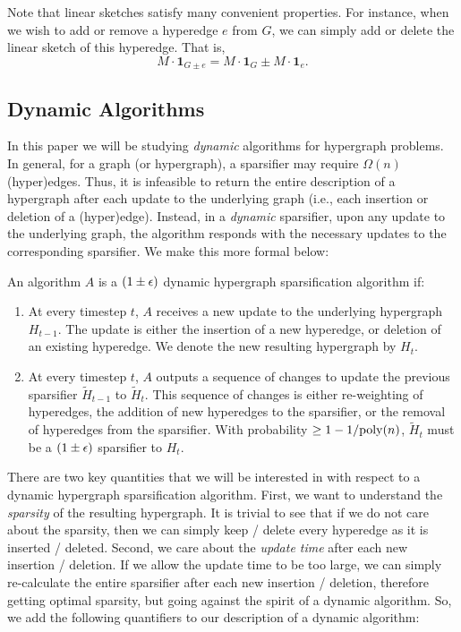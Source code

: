 \documentclass{article}
\begin{document}
Note that linear sketches satisfy many convenient properties. For instance, when we wish to add or remove a hyperedge $e$ from $G$, we can simply add or delete the linear sketch of this hyperedge. That is,
\[
M \cdot \mathbf{1}_{G\pm e} = M \cdot \mathbf{1}_{G} \pm M \cdot \mathbf{1}_e.
\]

\subsection{Dynamic Algorithms}

In this paper we will be studying \emph{dynamic} algorithms for hypergraph problems. In general, for a graph (or hypergraph), a sparsifier may require $\Omega(n)$ (hyper)edges. Thus, it is infeasible to return the entire description of a hypergraph after each update to the underlying graph (i.e., each insertion or deletion of a (hyper)edge). Instead, in a \emph{dynamic} sparsifier, upon any update to the underlying graph, the algorithm responds with the necessary updates to the corresponding sparsifier. We make this more formal below:

\begin{definition}\label{def:dynamicHypergraphSparsifier}
    An algorithm $A$ is a $(1 \pm \epsilon)$ dynamic hypergraph sparsification algorithm if:
    \begin{enumerate}
        \item At every timestep $t$, $A$ receives a new update to the underlying hypergraph $H_{t-1}$. The update is either the insertion of a new hyperedge, or deletion of an existing hyperedge. We denote the new resulting hypergraph by $H_t$.
        \item At every timestep $t$, $A$ outputs a sequence of changes to update the previous sparsifier $\widetilde{H}_{t-1}$ to $\widetilde{H}_{t}$. This sequence of changes is either re-weighting of hyperedges, the addition of new hyperedges to the sparsifier, or the removal of hyperedges from the sparsifier. With probability $\geq 1 - 1 / \mathrm{poly}(n)$, $\widetilde{H}_{t}$ must be a $(1 \pm \epsilon)$ sparsifier to $H_t$.
    \end{enumerate}
\end{definition}

There are two key quantities that we will be interested in with respect to a dynamic hypergraph sparsification algorithm. First, we want to understand the \emph{sparsity} of the resulting hypergraph. It is trivial to see that if we do not care about the sparsity, then we can simply keep / delete every hyperedge as it is inserted / deleted. Second, we care about the \emph{update time} after each new insertion / deletion. If we allow the update time to be too large, we can simply re-calculate the entire sparsifier after each new insertion / deletion, therefore getting optimal sparsity, but going against the spirit of a dynamic algorithm. So, we add the following quantifiers to our description of a dynamic algorithm:
\end{document}
